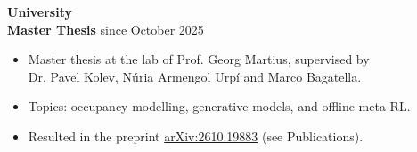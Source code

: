 \documentclass{article}
\begin{document}


\textbf{University} \\


% 

\noindent \textbf{Master Thesis} \hfill since October 2025
\begin{itemize}[noitemsep,nolistsep,leftmargin=*]
    \item Master thesis at the lab of Prof. Georg Martius, supervised by \\
    Dr. Pavel Kolev, Núria Armengol Urpí and Marco Bagatella.
    \item Topics: occupancy modelling, generative models, and offline meta-RL.
    \item Resulted in the preprint \href{https://arxiv.org/abs/2610.19883}{arXiv:2610.19883} (see Publications).\\
\end{itemize}
\end{document}
